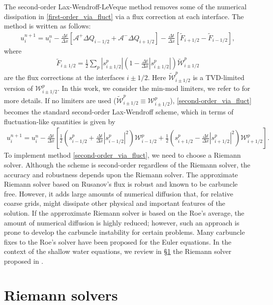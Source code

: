 \documentclass[preprint, 11pt]{article}
\newcommand{\W}{{\mathcal W}}
\newcommand{\A}{{\mathcal A}}
\begin{document}
The second-order Lax-Wendroff-LeVeque method removes some of the numerical dissipation in 
\eqref{first-order_via_fluct} via a flux correction at each interface. The method is written as follows:
\begin{align}\label{second-order_via_fluct}
  u_i^{n+1} = u_i^n-\frac{\Delta t}{\Delta x}\left[\A^+\Delta Q_{i-1/2}+\A^-\Delta Q_{i+1/2}\right]
  -\frac{\Delta t}{\Delta x}\left[\tilde{F}_{i+1/2}-\tilde{F}_{i-1/2}\right],
\end{align}
where 
\begin{align*}
  \tilde{F}_{i\pm 1/2}=\frac{1}{2}\sum_p|s_{i\pm 1/2}^p|\left(1-\frac{\Delta t}{\Delta x}|s_{i\pm 1/2}^p|\right)\tilde\W_{i\pm 1/2}^p
\end{align*}
are the flux corrections at the interfaces $i\pm 1/2$. Here $\tilde{\W}_{i\pm 1/2}^p$ is a 
TVD-limited version of $\W_{i\pm 1/2}^p$. 
In this work, we consider the min-mod limiters, we refer to \cite{leveque1997wave} for more details. 
If no limiters are used 
($\tilde \W_{i\pm 1/2}^p\equiv \W_{i\pm 1/2}^p$), \eqref{second-order_via_fluct} becomes
the standard second-order Lax-Wendroff scheme, which in terms of fluctuation-like quantities 
is given by
\begin{align*}
  u_i^{n+1}=u_i^n-\frac{\Delta t}{\Delta x}
\left[
  \frac{1}{2}\left(s_{i-1/2}^p+\frac{\Delta t}{\Delta x}|s_{i-1/2}^p|^2\right)\W_{i-1/2}^p
  +
  \frac{1}{2}\left(s_{i+1/2}^p-\frac{\Delta t}{\Delta x}|s_{i+1/2}^p|^2\right)\W_{i+1/2}^p
\right].
\end{align*}
To implement method \eqref{second-order_via_fluct}, 
we need to choose a Riemann solver. Although the scheme is second-order 
regardless of the Riemann solver, the accuracy and robustness depends upon the 
Riemann solver. The approximate Riemann solver based on Rusanov's flux is robust and known to be carbuncle free. 
However, it adds large amounts of numerical diffusion that, for relative coarse grids, 
might dissipate other physical and important features of the solution. If the apprroximate Riemann solver 
is based on the Roe's average, the amount of numerical diffusion is highly reduced; however, 
such an approach is prone to develop the carbuncle instability for certain problems. 
Many carbuncle fixes to the Roe's solver have been proposed for the Euler equations. 
In the context of the shallow water equations, we review in \S\ref{sec:riemann_solvers} 
the Riemann solver proposed in \cite{kemm2014note}.

\section{Riemann solvers}\label{sec:riemann_solvers}
\end{document}
